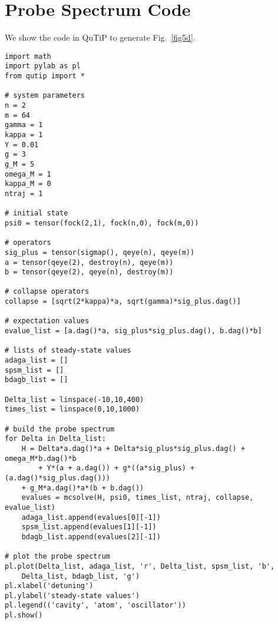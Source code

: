 \chapter{Probe Spectrum Code}
We show the code in QuTiP to generate Fig.~\ref{fig5d}.

\begin{verbatim}
import math
import pylab as pl
from qutip import *

# system parameters
n = 2
m = 64
gamma = 1
kappa = 1
Y = 0.01
g = 3
g_M = 5
omega_M = 1
kappa_M = 0
ntraj = 1

# initial state
psi0 = tensor(fock(2,1), fock(n,0), fock(m,0))

# operators
sig_plus = tensor(sigmap(), qeye(n), qeye(m))
a = tensor(qeye(2), destroy(n), qeye(m))
b = tensor(qeye(2), qeye(n), destroy(m))

# collapse operators
collapse = [sqrt(2*kappa)*a, sqrt(gamma)*sig_plus.dag()]

# expectation values
evalue_list = [a.dag()*a, sig_plus*sig_plus.dag(), b.dag()*b]

# lists of steady-state values
adaga_list = []
spsm_list = []
bdagb_list = []

Delta_list = linspace(-10,10,400)
times_list = linspace(0,10,1000)

# build the probe spectrum
for Delta in Delta_list:
    H = Delta*a.dag()*a + Delta*sig_plus*sig_plus.dag() + omega_M*b.dag()*b 
    	+ Y*(a + a.dag()) + g*((a*sig_plus) + (a.dag()*sig_plus.dag())) 
	+ g_M*a.dag()*a*(b + b.dag())
    evalues = mcsolve(H, psi0, times_list, ntraj, collapse, evalue_list)
    adaga_list.append(evalues[0][-1])
    spsm_list.append(evalues[1][-1])
    bdagb_list.append(evalues[2][-1])

# plot the probe spectrum
pl.plot(Delta_list, adaga_list, 'r', Delta_list, spsm_list, 'b', 
	Delta_list, bdagb_list, 'g')
pl.xlabel('detuning')
pl.ylabel('steady-state values')
pl.legend(('cavity', 'atom', 'oscillator'))
pl.show()
\end{verbatim}